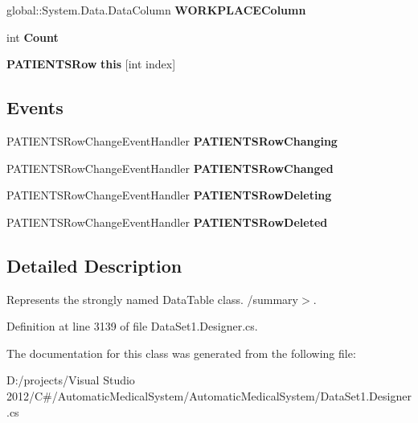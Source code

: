 \begin{CompactItemize}
\item 
global::System.Data.DataColumn \textbf{WORKPLACEColumn}\hspace{0.3cm}{\tt  [get]}\label{class_automatic_medical_system_1_1_data_set1_1_1_p_a_t_i_e_n_t_s_data_table_0b6814160a9111fd1c1062cb25e1b31b}

\item 
int \textbf{Count}\hspace{0.3cm}{\tt  [get]}\label{class_automatic_medical_system_1_1_data_set1_1_1_p_a_t_i_e_n_t_s_data_table_1b8a1357ddaa35de6546ff6c2c86a42c}

\item 
{\bf PATIENTSRow} \textbf{this} [int index]\hspace{0.3cm}{\tt  [get]}\label{class_automatic_medical_system_1_1_data_set1_1_1_p_a_t_i_e_n_t_s_data_table_77ab14184668ec79a2f6b2769784ca7b}

\end{CompactItemize}
\subsection*{Events}
\begin{CompactItemize}
\item 
PATIENTSRowChangeEventHandler \textbf{PATIENTSRowChanging}\label{class_automatic_medical_system_1_1_data_set1_1_1_p_a_t_i_e_n_t_s_data_table_f4015ff0a6a10ad83af3c4968b982857}

\item 
PATIENTSRowChangeEventHandler \textbf{PATIENTSRowChanged}\label{class_automatic_medical_system_1_1_data_set1_1_1_p_a_t_i_e_n_t_s_data_table_31f02971e79ef268245ceb6c4d44df14}

\item 
PATIENTSRowChangeEventHandler \textbf{PATIENTSRowDeleting}\label{class_automatic_medical_system_1_1_data_set1_1_1_p_a_t_i_e_n_t_s_data_table_ad51290746a09098ec50ac857f6e781d}

\item 
PATIENTSRowChangeEventHandler \textbf{PATIENTSRowDeleted}\label{class_automatic_medical_system_1_1_data_set1_1_1_p_a_t_i_e_n_t_s_data_table_9fab57598bca26142122dc801663229a}

\end{CompactItemize}


\subsection{Detailed Description}
Represents the strongly named DataTable class. /summary$>$. 

Definition at line 3139 of file DataSet1.Designer.cs.

The documentation for this class was generated from the following file:\begin{CompactItemize}
\item 
D:/projects/Visual Studio 2012/C\#/AutomaticMedicalSystem/AutomaticMedicalSystem/DataSet1.Designer.cs\end{CompactItemize}
